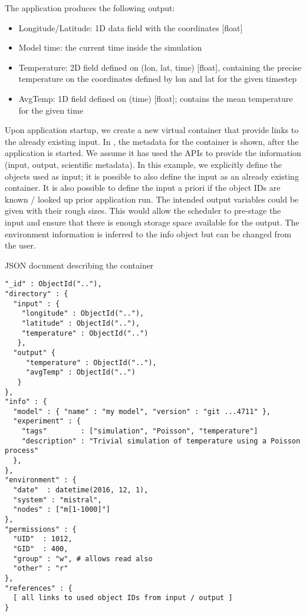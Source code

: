 The application produces the following output:
\begin{itemize}
  \item Longitude/Latitude: 1D data field with the coordinates [float]
  \item Model time: the current time inside the simulation
  \item Temperature: 2D field defined on (lon, lat, time) [float], containing the precise temperature on the coordinates defined by lon and lat for the given timestep
  \item AvgTemp: 1D field defined on (time) [float]; contains the mean temperature for the given time
\end{itemize}


Upon application startup, we create a new virtual container that provide links to the already existing input.
In , the metadata for the container is shown, after the application is started.
We assume it has used the APIs to provide the information (input, output, scientific metadata).
In this example, we explicitly define the objects used as input; it is possible to also define
the input as an already existing container.
It is also possible to define the input a priori if the object IDs are known / looked up prior application run.
The intended output variables could be given with their rough sizes.
This would allow the scheduler to pre-stage the input and ensure that there is enough storage space available for the output.
The environment information is inferred to the info object but can be changed from the user.

\begin{tcbcode}[label={lst:mongoContainer}]{JSON document describing the container}
\begin{lstlisting}
"_id" : ObjectId(".."),
"directory" : {
  "input" : {
    "longitude" : ObjectId(".."),
    "latitude" : ObjectId(".."),
    "temperature" : ObjectId("..")
   },
  "output" {
     "temperature" : ObjectId(".."),
     "avgTemp" : ObjectId("..")
   }
},
"info" : {
  "model" : { "name" : "my model", "version" : "git ...4711" },
  "experiment" : {
    "tags"        : ["simulation", "Poisson", "temperature"]
    "description" : "Trivial simulation of temperature using a Poisson process"
  },
},
"environment" : {
  "date"  : datetime(2016, 12, 1),
  "system" : "mistral",
  "nodes" : ["m[1-1000]"]
},
"permissions" : {
  "UID"  : 1012,
  "GID"  : 400,
  "group" : "w", # allows read also
  "other" : "r"
},
"references" : {
  [ all links to used object IDs from input / output ]
}
\end{lstlisting}
\end{tcbcode}

